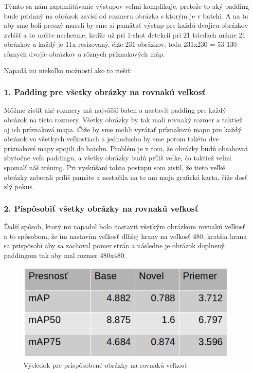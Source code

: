 Týmto sa nám zapamätávanie výstupov veľmi komplikuje, pretože to aký padding bude pridaný na obrázok zavisí od rozmeru obrázka s ktorým je v batchi. A na to aby sme boli presný museli by sme si pamätať výstup pre každú dvojicu obrázkov zvlášť a to určite nechceme, keďže už pri 1-shot detekcii pri 21 triedach máme 21 obrázkov a každý je 11x resizovaný, čiže 231 obrázkov, teda 231x230 = 53 130 rôznych dvojíc obrázkov a rôznych príznakových máp. 

Napadá mi niekoľko možností ako to riešiť:

\subsubsection{1. Padding pre všetky obrázky na rovnakú veľkosť}

Môžme zistiť aké rozmery má najväčší batch a nastaviť padding pre každý obrázok na tieto rozmery. Všetky obrázky by tak mali rovnaký rozmer a taktiež aj ich príznaková mapa. Čiže by sme mohli vyrátať príznakovú mapu pre každý obrázok vo všetkych veľkostiach a jednoducho by sme potom takéto dve príznakové mapy spojili do batchu. Problém je v tom, že obrázky budú obsahovať zbytočne veľa paddingu, a všetky obrázky budú príliš veľke, čo taktiež veľmi spomalí náš tréning. Pri vyskúšaní tohto postupu som zistil, že tieto veľké obrázky zaberali príliš pamäte a nestačila na to ani moja grafická karta, čiže dosť zlý pokus. 

\subsubsection{2. Pispôsobiť všetky obrázky na rovnakú veľkosť}

Ďalší spôsob, ktorý mi napadol bolo nastaviť všetkým obrázkom rovnakú veľkosť a to spôsobom, že im nastavím veľkosť dlhšej hrany na veľkosť 480, kratšia hrana sa prispôsobí aby sa zachoval pomer strán a následne je obrázok doplnený paddingom tak aby mal rozmer 480x480. 

\begin{figure}[H]
\centering
\includegraphics[width=\textwidth]{images/same_size_table.png}
\caption{Výsledok pre prispôsobené obrázky na rovnakú veľkosť}
\label{fig:image24}
\end{figure}

